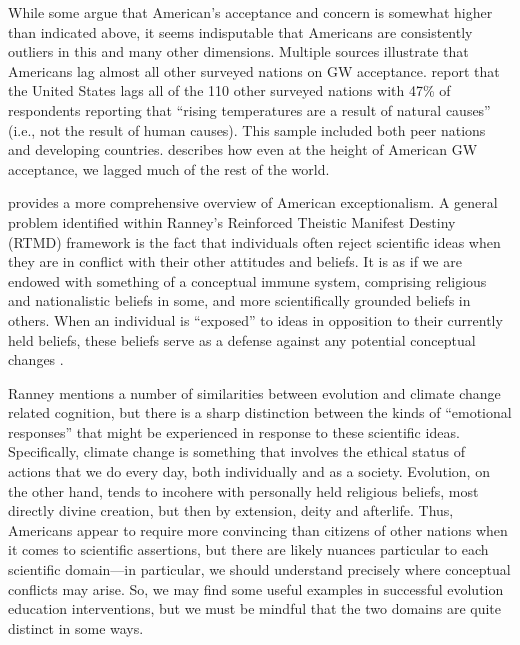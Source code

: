 While some \parencite[e.g.,][]{krosnick_does_2013} argue that American's
acceptance and concern is somewhat higher than indicated above, it seems
indisputable that Americans are consistently outliers in this and many other
dimensions. Multiple sources illustrate that Americans lag almost all other
surveyed nations on GW acceptance.  \textcite{ray_worldwide_2010} report that
the United States lags all of the 110 other surveyed nations with 47\% of
respondents reporting that “rising temperatures are a result of natural causes”
(i.e., not the result of human causes). This sample included both peer nations
and developing countries.  \textcite{leiserowitz_international_2007} describes
how even at the height of American GW acceptance, we lagged much of the rest of
the world.



\textcite{ranney_why_2012} provides a more comprehensive overview of American
exceptionalism.  A general problem identified within Ranney's Reinforced
Theistic Manifest Destiny (RTMD) framework is the fact that individuals often
reject scientific ideas when they are in conflict with their other attitudes and
beliefs. It is as if we are endowed with something of a conceptual immune system,
comprising religious and nationalistic beliefs in some, and more scientifically
grounded beliefs in others. When an individual is “exposed” to ideas in
opposition to their currently held beliefs, these beliefs serve as a defense
against any potential conceptual changes \parencite[as also discussed
by][]{shepherd_perpetuation_2012}.

Ranney mentions a number of similarities between evolution and climate change
related cognition, but there is a sharp distinction between the kinds of
``emotional responses'' that might be experienced in response to these
scientific ideas. Specifically, climate change is something that involves the
ethical status of actions that we do every day, both individually and as a
society.  Evolution, on the other hand, tends to incohere with personally held
religious beliefs, most directly divine creation, but then by extension, deity
and afterlife. Thus, Americans appear to require more convincing than citizens
of other nations when it comes to scientific assertions, but there are likely
nuances particular to each scientific domain---in particular, we should
understand precisely where conceptual conflicts may arise. So, we may find
some useful examples in successful evolution education interventions, but we must
be mindful that the two domains are quite distinct in some ways.

